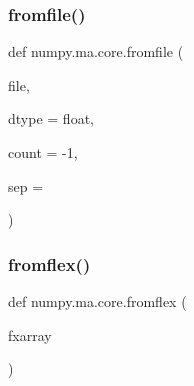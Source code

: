 \subsubsection{\texorpdfstring{fromfile()}{fromfile()}}
{\footnotesize\ttfamily def numpy.\+ma.\+core.\+fromfile (\begin{DoxyParamCaption}\item[{}]{file,  }\item[{}]{dtype = {\ttfamily float},  }\item[{}]{count = {\ttfamily -\/1},  }\item[{}]{sep = {\ttfamily \textquotesingle{}\textquotesingle{}} }\end{DoxyParamCaption})}

\mbox{\label{namespacenumpy_1_1ma_1_1core_a2c8a2c9e4a2326876993441dee0f36f0}} 
\subsubsection{\texorpdfstring{fromflex()}{fromflex()}}
{\footnotesize\ttfamily def numpy.\+ma.\+core.\+fromflex (\begin{DoxyParamCaption}\item[{}]{fxarray }\end{DoxyParamCaption})}

